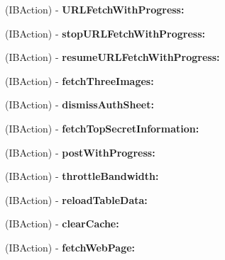 \begin{DoxyCompactItemize}
\item 
\hypertarget{interface_app_delegate_a31be6a08dc6a3f484bc48210daf92f4a}{
(\-I\-B\-Action) -\/ {\bfseries \-U\-R\-L\-Fetch\-With\-Progress\-:}}
\label{interface_app_delegate_a31be6a08dc6a3f484bc48210daf92f4a}

\item 
\hypertarget{interface_app_delegate_a65dab657243398839f2c784bf000089c}{
(\-I\-B\-Action) -\/ {\bfseries stop\-U\-R\-L\-Fetch\-With\-Progress\-:}}
\label{interface_app_delegate_a65dab657243398839f2c784bf000089c}

\item 
\hypertarget{interface_app_delegate_a2cade9ac0202476ed05e61f80bf264d7}{
(\-I\-B\-Action) -\/ {\bfseries resume\-U\-R\-L\-Fetch\-With\-Progress\-:}}
\label{interface_app_delegate_a2cade9ac0202476ed05e61f80bf264d7}

\item 
\hypertarget{interface_app_delegate_ac4539e36ee04667d57b2c8e04d86ab2b}{
(\-I\-B\-Action) -\/ {\bfseries fetch\-Three\-Images\-:}}
\label{interface_app_delegate_ac4539e36ee04667d57b2c8e04d86ab2b}

\item 
\hypertarget{interface_app_delegate_a58df587c5185342c391c88891df13914}{
(\-I\-B\-Action) -\/ {\bfseries dismiss\-Auth\-Sheet\-:}}
\label{interface_app_delegate_a58df587c5185342c391c88891df13914}

\item 
\hypertarget{interface_app_delegate_ac5d049cda6ea4cca2ea549a7401bda67}{
(\-I\-B\-Action) -\/ {\bfseries fetch\-Top\-Secret\-Information\-:}}
\label{interface_app_delegate_ac5d049cda6ea4cca2ea549a7401bda67}

\item 
\hypertarget{interface_app_delegate_a4d9bbab2eacd4f9218efa3727fbd02bf}{
(\-I\-B\-Action) -\/ {\bfseries post\-With\-Progress\-:}}
\label{interface_app_delegate_a4d9bbab2eacd4f9218efa3727fbd02bf}

\item 
\hypertarget{interface_app_delegate_ae80de33af1d53d57d24dfa85ea56d543}{
(\-I\-B\-Action) -\/ {\bfseries throttle\-Bandwidth\-:}}
\label{interface_app_delegate_ae80de33af1d53d57d24dfa85ea56d543}

\item 
\hypertarget{interface_app_delegate_a54f614d323c51ccc4b9f481ddce8ff77}{
(\-I\-B\-Action) -\/ {\bfseries reload\-Table\-Data\-:}}
\label{interface_app_delegate_a54f614d323c51ccc4b9f481ddce8ff77}

\item 
\hypertarget{interface_app_delegate_ac380181c5d1e01d047ed5937d615f3b6}{
(\-I\-B\-Action) -\/ {\bfseries clear\-Cache\-:}}
\label{interface_app_delegate_ac380181c5d1e01d047ed5937d615f3b6}

\item 
\hypertarget{interface_app_delegate_a70ac16ace7467246814859f19b0fc65c}{
(\-I\-B\-Action) -\/ {\bfseries fetch\-Web\-Page\-:}}
\label{interface_app_delegate_a70ac16ace7467246814859f19b0fc65c}

\end{DoxyCompactItemize}
